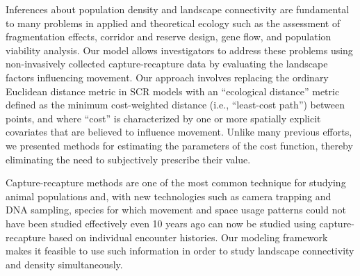 \documentclass[12pt]{article}
\begin{document}
\begin{spacing}{1.8}

Inferences about population density and landscape connectivity
are fundamental to many problems in
applied and theoretical ecology such as the assessment of fragmentation
effects, corridor and reserve design, gene flow, and population viability
analysis.  Our  model allows
investigators to address these problems using non-invasively collected
capture-recapture data by evaluating the landscape
factors influencing movement. %
Our approach involves replacing the ordinary Euclidean distance metric
in SCR models with %
an ``ecological distance'' metric defined as the minimum cost-weighted
distance (i.e., ``least-cost
path'') between points, and where ``cost'' is characterized by one or
more spatially explicit covariates that are believed to influence
movement. %
Unlike many previous efforts, we presented methods for estimating the
parameters of the cost function, thereby eliminating the need to
subjectively prescribe their value.

Capture-recapture methods are one of the most common technique for studying
animal populations and, with new technologies such as camera trapping
and DNA sampling, species for which movement and space usage patterns
could not have been studied effectively even 10 years ago can now be
studied using capture-recapture based on individual encounter
histories.  Our modeling framework makes it feasible to use such
information in order to study landscape connectivity and density
simultaneously. 


\end{spacing}
\end{document}
